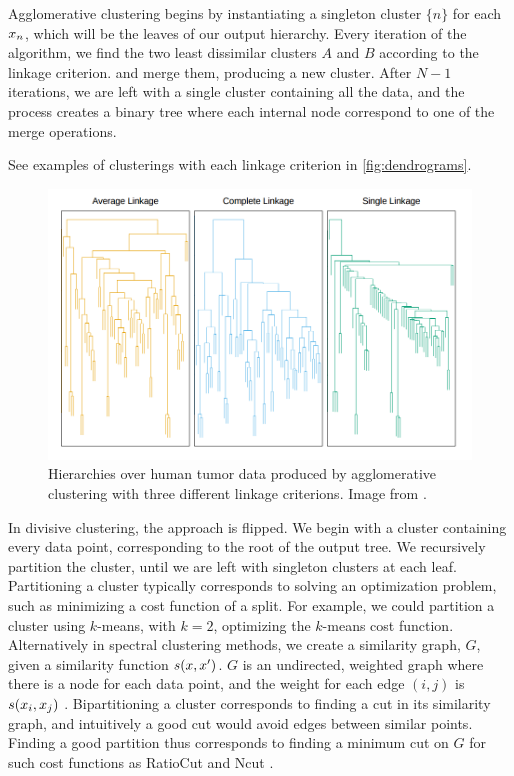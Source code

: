 Agglomerative clustering begins by instantiating
a singleton cluster $\{n\}$ for each $x_n$, which
will be the leaves of our output hierarchy.
Every iteration of the algorithm, 
we find
the two least dissimilar clusters $A$ and $B$
according to the linkage criterion.
and merge them, producing a new cluster.
After $N - 1$ iterations, we are left
with a single cluster containing
all the data, and the process
creates a binary tree where each internal node
correspond to one of the merge operations.

See examples of clusterings with each
linkage criterion
in \autoref{fig:dendrograms}.


\begin{figure}[t]
  \includegraphics[width=\textwidth]{img/trees/dendrograms}
  \caption{Hierarchies over human tumor data produced by agglomerative clustering
    with three different linkage criterions. 
  Image from \citet{Hastie2009}.}
\label{fig:dendrograms}
\end{figure}

In divisive clustering, the approach is flipped.
We begin with a cluster containing
every data point, corresponding
to the root of the output tree.
We recursively
partition the cluster, until 
we are left with singleton clusters
at each leaf.
Partitioning a cluster
typically corresponds to solving
an optimization problem, such as minimizing
a cost function of a split.
For example, we could partition
a cluster using $k$-means, with $k = 2$,
optimizing the $k$-means cost function.
Alternatively in spectral clustering methods,
we create a similarity graph, $G$,
given a similarity function $s(x, x^\prime)$.
$G$ is an undirected, weighted graph
where there is a node for each data point,
and the weight for each edge $(i, j)$ is
$s(x_i, x_j)$ \citep{VonLuxburg2007}.
Bipartitioning a cluster
corresponds to finding a cut in its similarity graph,
and intuitively a good cut would avoid
edges between similar points.
Finding a good partition thus corresponds
to finding a minimum cut on $G$
for such cost functions as
RatioCut \citep{Hagen1992} and Ncut \citep{Shi2000}.

